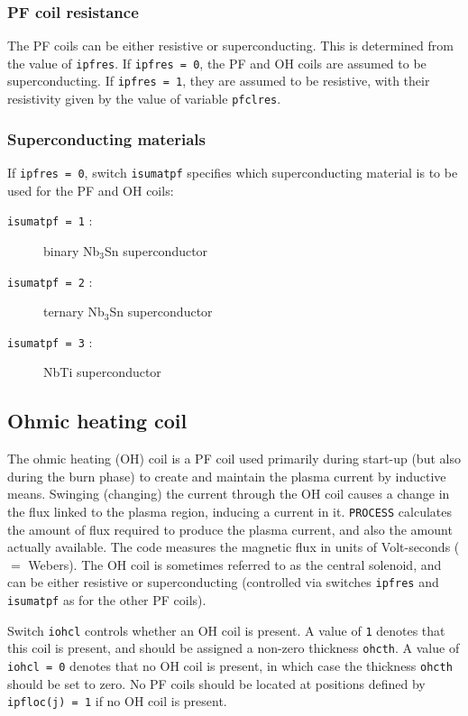 \documentclass[11pt,a4paper]{report}
\newcommand{\process}{\mbox{\texttt{PROCESS}}}
\begin{document}
\subsubsection{PF coil resistance}

The PF coils can be either resistive or superconducting. This is determined
from the value of \texttt{ipfres}. If \texttt{ipfres = 0}, the PF and OH coils
are assumed to be superconducting. If \texttt{ipfres = 1}, they are assumed to
be resistive, with their resistivity given by the value of variable
\texttt{pfclres}.

\subsubsection{Superconducting materials}

If \texttt{ipfres = 0}, switch \texttt{isumatpf} specifies which
superconducting material is to be used for the PF and OH coils:
\begin{description}
\item [\texttt{isumatpf = 1} :] binary Nb$_3$Sn superconductor
\item [\texttt{isumatpf = 2} :] ternary Nb$_3$Sn superconductor
\item [\texttt{isumatpf = 3} :] NbTi superconductor
\end{description}

\subsection{Ohmic heating coil}
\label{sec:ohcoil}

The ohmic heating (OH) coil is a PF coil used primarily during start-up (but
also during the burn phase) to create and maintain the plasma current by
inductive means. Swinging (changing) the current through the OH coil causes a
change in the flux linked to the plasma region, inducing a current in
it. \process\/ calculates the amount of flux required to produce the plasma
current, and also the amount actually available. The code measures the
magnetic flux in units of Volt-seconds ($=$ Webers). The OH coil is sometimes
referred to as the central solenoid, and can be either resistive or
superconducting (controlled via switches \texttt{ipfres} and \texttt{isumatpf}
as for the other PF coils).

Switch \texttt{iohcl} controls whether an OH coil is present. A value of
\texttt{1} denotes that this coil is present, and should be assigned a
non-zero thickness \texttt{ohcth}. A value of \texttt{iohcl = 0} denotes that
no OH coil is present, in which case the thickness \texttt{ohcth} should be
set to zero. No PF coils should be located at positions defined by
\texttt{ipfloc(j) = 1} if no OH coil is present.
\end{document}

